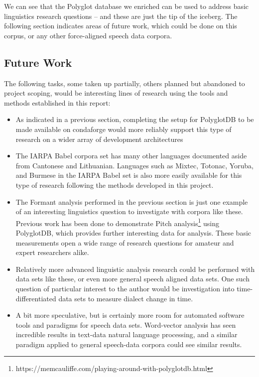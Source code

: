\documentclass[11pt]{article}
\begin{document}
We can see that the Polyglot database we enriched can be used to address basic linguistics research questions -- and these are just the tip of the iceberg. The following section indicates areas of future work, which could be done on this corpus, or any other force-aligned speech data corpora.

\subsection{Future Work}

The following tasks, some taken up partially, others planned but abandoned to project scoping, would be interesting lines of research using the tools and methods established in this report:

\begin{itemize}
  \item As indicated in a previous section, completing the setup for PolyglotDB to be made available on condaforge would more reliably support this type of research on a wider array of development architectures
  \item The IARPA Babel corpora set has many other languages documented aside from Cantonese and Lithuanian. Languages such as Mixtec, Totonac, Yoruba, and Burmese in the IARPA Babel set is also more easily available for this type of research following the methods developed in this project.
  \item The Formant analysis performed in the previous section is just one example of an interesting linguistics question to investigate with corpora like these. Previous work has been done to demonstrate Pitch analysis\footnote{https://memcauliffe.com/playing-around-with-polyglotdb.html} using PolyglotDB, which provides further interesting data for analysis. These basic measurements open a wide range of research questions for amateur and expert researchers alike.
  \item Relatively more advanced linguistic analysis research could be performed with data sets like these, or even more general speech aligned data sets. One such question of particular interest to the author would be investigation into time-differentiated data sets to measure dialect change in time.
\item A bit more speculative, but is certainly more room for automated software tools and paradigms for speech data sets. Word-vector analysis has seen incredible results in text-data natural language processing, and a similar paradigm applied to general speech-data corpora could see similar results.
\end{itemize}
\end{document}
